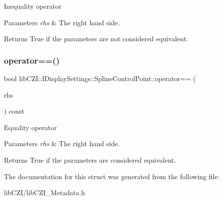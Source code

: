 Inequality operator 
\begin{DoxyParams}{Parameters}
{\em rhs} & The right hand side. \\
\hline
\end{DoxyParams}
\begin{DoxyReturn}{Returns}
True if the parameters are not considered equivalent. 
\end{DoxyReturn}
\mbox{\label{structlib_c_z_i_1_1_i_display_settings_1_1_spline_control_point_ac81ec8f0c154cc1d840c1af1e9d46fd8}} 
\subsubsection{\texorpdfstring{operator==()}{operator==()}}
{\footnotesize\ttfamily bool lib\+C\+Z\+I\+::\+I\+Display\+Settings\+::\+Spline\+Control\+Point\+::operator== (\begin{DoxyParamCaption}\item[{const \hyperlink{structlib_c_z_i_1_1_i_display_settings_1_1_spline_control_point}{Spline\+Control\+Point} \&}]{rhs }\end{DoxyParamCaption}) const\hspace{0.3cm}{\ttfamily [inline]}}

Equality operator 
\begin{DoxyParams}{Parameters}
{\em rhs} & The right hand side. \\
\hline
\end{DoxyParams}
\begin{DoxyReturn}{Returns}
True if the parameters are considered equivalent. 
\end{DoxyReturn}


The documentation for this struct was generated from the following file\+:\begin{DoxyCompactItemize}
\item 
lib\+C\+Z\+I/lib\+C\+Z\+I\+\_\+\+Metadata.\+h\end{DoxyCompactItemize}
